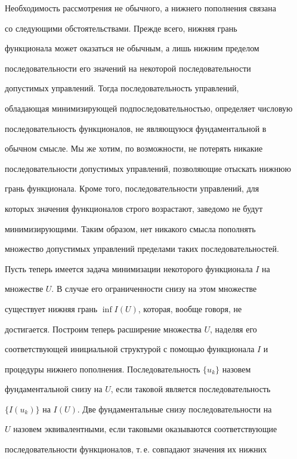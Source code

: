  


Необходимость рассмотрения не обычного, а нижнего пополнения связана 


со следующими обстоятельствами. Прежде всего, нижняя грань 


функционала может оказаться не обычным, а лишь нижним пределом 


последовательности его значений на некоторой последовательности 


допустимых управлений. Тогда последовательность управлений, 


обладающая минимизирующей подпоследовательностью, определяет числовую 


последовательность функционалов, не являющуюся фундаментальной в 


обычном смысле. Мы же хотим, по возможности, не потерять никакие 


последовательности допустимых управлений, позволяющие отыскать нижнюю 


грань функционала. Кроме того, последовательности управлений, для 


которых значения функционалов строго возрастают, заведомо не будут 


минимизирующими. Таким образом, нет никакого смысла пополнять 


множество допустимых управлений пределами таких последовательностей. 


 


Пусть теперь имеется задача минимизации некоторого функционала $I$ на 


множестве $U$. В случае его ограниченности снизу на этом множестве 


существует нижняя грань $\inf I(U)$, которая, вообще говоря, не 


достигается. Построим теперь расширение множества $U$, наделяя его 


соответствующей инициальной структурой с помощью функционала $I$ и 


процедуры нижнего пополнения. Последовательность $\{u_k\}$ назовем 


фундаментальной снизу на $U$, если таковой является последовательность 


$\{I(u_k)\}$ на $I(U)$. Две фундаментальные снизу последовательности на 


$U$ назовем эквивалентными, если таковыми оказываются соответствующие 


последовательности функционалов, т.\,е. совпадают значения их нижних 


